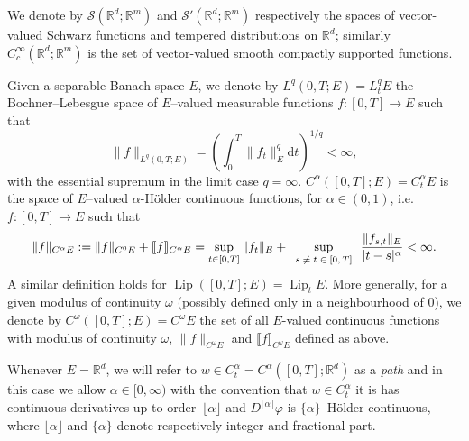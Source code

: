 \documentclass[10pt]{article}
\newcommand{\assign}{:=}
\newcommand{\mathd}{\mathrm{d}}
\newcommand{\tmem}[1]{{\em #1\/}}
\newcommand{\tmop}[1]{\ensuremath{\operatorname{#1}}}
\newcommand{\tmscript}[1]{\text{\scriptsize{$#1$}}}
\begin{document}
We denote by $\mathcal{S} (\mathbb{R}^d ; \mathbb{R}^m)$ and $\mathcal{S}'
(\mathbb{R}^d ; \mathbb{R}^m)$ respectively the spaces of vector\mbox{-}valued
Schwarz functions and tempered distributions on $\mathbb{R}^d$; similarly
$C^{\infty}_c (\mathbb{R}^d ; \mathbb{R}^m)$ is the set of
vector\mbox{-}valued smooth compactly supported functions.

Given a separable Banach space $E$, we denote by $L^q (0, T ; E) = L^q_t E$
the Bochner--Lebesgue space of $E$--valued measurable functions $f : [0, T]
\rightarrow E$ such that
\[ \| f \|_{L^q (0, T ; E)} = \left( \int_0^T \| f_t \|_E^q \mathd t
   \right)^{1 / q} < \infty, \]
with the essential supremum in the limit case $q = \infty$. $C^{\alpha} ([0,
T] ; E) = C^{\alpha}_t E$ is the space of $E$--valued $\alpha$-H\"{o}lder
continuous functions, for $\alpha \in (0, 1)$, i.e. $f : [0, T] \rightarrow E$
such that
\[ \| f \|_{C^{\alpha} E} \assign \| f \|_{C^0 E} + \llbracket f
   \rrbracket_{C^{\alpha} E} = \sup_{t \in [0, T]} \| f_t \|_E +
   \sup_{\tmscript{\begin{array}{c}
     s \neq t \in [0, T]
   \end{array}}} \frac{\| f_{s, t} \|_E}{| t - s |^{\alpha}} < \infty . \]
A similar definition holds for $\tmop{Lip} ([0, T] ; E) = \tmop{Lip}_t E$.
More generally, for a given modulus of continuity $\omega$ (possibly defined
only in a neighbourhood of $0$), we denote by $C^{\omega} ([0, T] ; E) =
C^{\omega} E$ the set of all $E$-valued continuous functions with modulus of
continuity $\omega$, $\| f \|_{C^{\omega} E}$ and $\llbracket f
\rrbracket_{C^{\omega} E}$ defined as above.

Whenever $E =\mathbb{R}^d$, we will refer to $w \in C^{\alpha}_t = C^{\alpha}
([0, T] ; \mathbb{R}^d)$ as a {\tmem{path}} and in this case we allow $\alpha
\in [0, \infty)$ with the convention that $w \in C_t^{\alpha}$ it is has
continuous derivatives up to order~$\lfloor \alpha \rfloor$ and $D^{\lfloor
\alpha \rfloor} \varphi$ is $\{ \alpha \}$--H\"{o}lder continuous, where
$\lfloor \alpha \rfloor$ and $\{ \alpha \}$ denote respectively integer and
fractional part.
\end{document}
